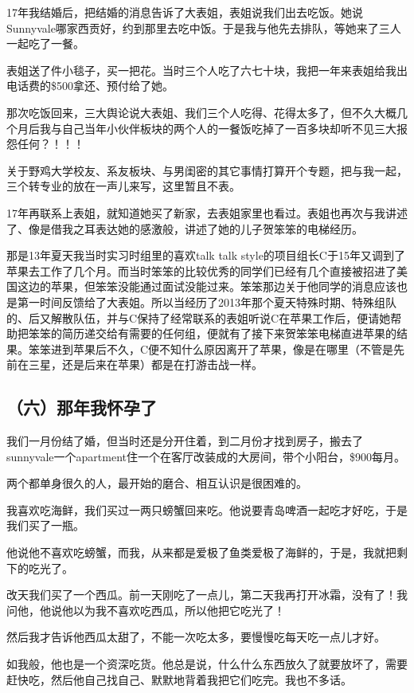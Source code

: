 \documentclass[9pt, b5paper]{article}
\begin{document}
17年我结婚后，把结婚的消息告诉了大表姐，表姐说我们出去吃饭。她说Sunnyvale哪家西贡好，约到那里去吃中饭。于是我与他先去排队，等她来了三人一起吃了一餐。

表姐送了件小毯子，买一把花。当时三个人吃了六七十块，我把一年来表姐给我出电话费的\$500拿还、预付给了她。

那次吃饭回来，三大舆论说大表姐、我们三个人吃得、花得太多了，但不久大概几个月后我与自己当年小伙伴板块的两个人的一餐饭吃掉了一百多块却听不见三大报怨任何？！！！

关于野鸡大学校友、系友板块、与男闺密的其它事情打算开个专题，把与我一起，三个转专业的放在一声儿来写，这里暂且不表。 

17年再联系上表姐，就知道她买了新家，去表姐家里也看过。表姐也再次与我讲述了、像是借我之耳表达她的感激般，讲述了她的儿子贺笨笨的电梯经历。

那是13年夏天我当时实习时组里的喜欢talk talk style的项目组长C于15年又调到了苹果去工作了几个月。而当时笨笨的比较优秀的同学们已经有几个直接被招进了美国这边的苹果，但笨笨没能通过面试没能过来。笨笨那边关于他同学的消息应该也是第一时间反馈给了大表姐。所以当经历了2013年那个夏天特殊时期、特殊组队的、后又解散队伍，并与C保持了经常联系的表姐听说C在苹果工作后，便请她帮助把笨笨的简历递交给有需要的任何组，便就有了接下来贺笨笨电梯直进苹果的结果。笨笨进到苹果后不久，C便不知什么原因离开了苹果，像是在哪里（不管是先前在三星，还是后来在苹果）都是在打游击战一样。 

\subsection{（六）那年我怀孕了}
\label{sec:orgfadb03d}

我们一月份结了婚，但当时还是分开住着，到二月份才找到房子，搬去了sunnyvale一个apartment住一个在客厅改装成的大房间，带个小阳台，\$900每月。

两个都单身很久的人，最开始的磨合、相互认识是很困难的。

我喜欢吃海鲜，我们买过一两只螃蟹回来吃。他说要青岛啤酒一起吃才好吃，于是我们买了一瓶。

他说他不喜欢吃螃蟹，而我，从来都是爱极了鱼类爱极了海鲜的，于是，我就把剩下的吃光了。

改天我们买了一个西瓜。前一天刚吃了一点儿，第二天我再打开冰霜，没有了！我问他，他说他以为我不喜欢吃西瓜，所以他把它吃光了！

然后我才告诉他西瓜太甜了，不能一次吃太多，要慢慢吃每天吃一点儿才好。

如我般，他也是一个资深吃货。他总是说，什么什么东西放久了就要放坏了，需要赶快吃，然后他自己找自己、默默地背着我把它们吃完。我也不多话。
\end{document}
